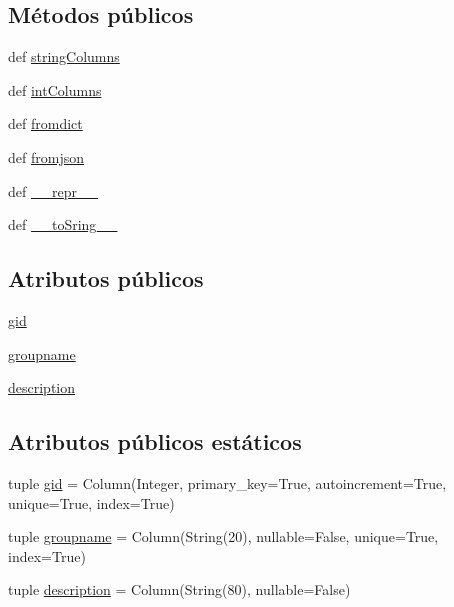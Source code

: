 \subsection*{Métodos públicos}
\begin{DoxyCompactItemize}
\item 
def \hyperlink{classdb__layer_1_1_group_a004ab9d415246c36f039e1afb2564927}{string\-Columns}
\item 
def \hyperlink{classdb__layer_1_1_group_aac09676e343d6fde6b9168b78612f60c}{int\-Columns}
\item 
def \hyperlink{classdb__layer_1_1_group_a9a3107391f24a653186fc349940c1370}{fromdict}
\item 
def \hyperlink{classdb__layer_1_1_group_a1c492e33e84e5d601f33b719ab55fc87}{fromjson}
\item 
def \hyperlink{classdb__layer_1_1_group_aef6cf965b5d044fd05881fb31dd8aed6}{\-\_\-\-\_\-repr\-\_\-\-\_\-}
\item 
def \hyperlink{classdb__layer_1_1_group_a3aeaee5af2612241745f52de063bee7f}{\-\_\-\-\_\-to\-Sring\-\_\-\-\_\-}
\end{DoxyCompactItemize}
\subsection*{Atributos públicos}
\begin{DoxyCompactItemize}
\item 
\hyperlink{classdb__layer_1_1_group_a552e384a20b221ca4638a4b4657e5dcd}{gid}
\item 
\hyperlink{classdb__layer_1_1_group_a564387ddb516e801f8f0ab0ec0537d5c}{groupname}
\item 
\hyperlink{classdb__layer_1_1_group_a35bd06719f741837e5dda249b6d87de5}{description}
\end{DoxyCompactItemize}
\subsection*{Atributos públicos estáticos}
\begin{DoxyCompactItemize}
\item 
tuple \hyperlink{classdb__layer_1_1_group_ad04297ad13e077524983def6a0af935b}{gid} = Column(Integer, primary\-\_\-key=True, autoincrement=True, unique=True, index=True)
\item 
tuple \hyperlink{classdb__layer_1_1_group_adc9753e87b2f964d8f97215cd689ad16}{groupname} = Column(String(20), nullable=False, unique=True, index=True)
\item 
tuple \hyperlink{classdb__layer_1_1_group_a00befb85344be6b17805cd048b2b1d6d}{description} = Column(String(80), nullable=False)
\end{DoxyCompactItemize}


